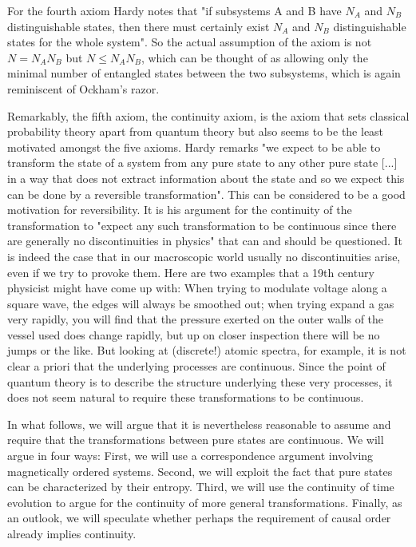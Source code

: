 \documentclass[11pt, a4paper]{article}
\begin{document}
For the fourth axiom Hardy notes that "if subsystems A and B have $N_A$ and $N_B$ distinguishable states, then there must certainly exist $N_A$ and $N_B$ distinguishable states for the whole system". So the actual assumption of the axiom is not $N=N_AN_B$ but $N\leq N_AN_B$, which can be thought of as allowing only the minimal number of entangled states between the two subsystems, which is again reminiscent of Ockham's razor. \par
Remarkably, the fifth axiom, the continuity axiom, is the axiom that sets classical probability theory apart from quantum theory but also seems to be the least motivated amongst the five axioms. Hardy remarks "we expect to be able to transform the state of a system from any pure state to any other pure state [...] in a way that does not extract information about the state and so we expect this can be done by a reversible transformation". This can be considered to be a good motivation for reversibility. It is his argument for the continuity of the transformation to "expect any such transformation to be continuous since there are generally no discontinuities in physics" that can and should be questioned. It is indeed the case that in our macroscopic world usually no discontinuities arise, even if we try to provoke them. Here are two examples that a 19th century physicist might have come up with: When trying to modulate voltage along a square wave, the edges will always be smoothed out; when trying  expand a gas very rapidly, you will find that the pressure exerted on the outer walls of the vessel used does change rapidly, but up on closer inspection there will be no jumps or the like. But looking at (discrete!) atomic spectra, for example, it is not clear a priori that the underlying processes are continuous. Since the point of quantum theory is to describe the structure underlying these very processes, it does not seem natural to require these transformations to be continuous.\par
In what follows, we will argue that it is nevertheless reasonable to assume and require that the transformations between pure states are continuous. We will argue in four ways: First, we will use a correspondence argument involving magnetically ordered systems. Second, we will exploit the fact that pure states can be characterized by their entropy. Third, we will use the continuity of time evolution to argue for the continuity of more general transformations. Finally, as an outlook, we will speculate whether perhaps the requirement of causal order already implies continuity.\par
\end{document}
